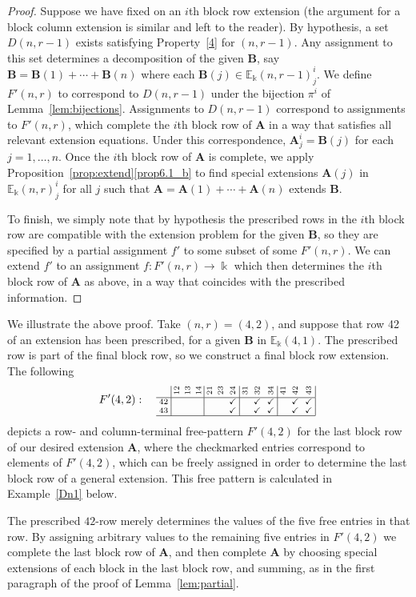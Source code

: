 \documentclass[ALCO,ThmDefs,Unicode,epreuves]{cedram}
\newcommand{\E}{\mathbb{E}}
\newcommand{\cm}{\checkmark}
\newcommand{\bA}{\mathbf{A}}
\newcommand{\bB}{\mathbf{B}}
\newcommand{\rt}[1]{\rotatebox{90}{#1}}
\begin{document}
\begin{proof}
Suppose we have fixed on an $i$th block row extension (the argument
for a block column extension is similar and left to the reader). By
hypothesis, a set $D(n,r-1)$ exists satisfying Property~\ref{4} for
$(n,r-1)$. Any assignment to this set determines a decomposition of
the given $\bB$, say $\bB = \bB(1)+ \cdots + \bB(n)$ where each
$\bB(j) \in \E_\Bbbk(n,r-1)^i_j$. We define $F'(n,r)$ to correspond
to $D(n,r-1)$ under the bijection $\pi^i$ of Lemma~\ref{lem:bijections}. Assignments to $D(n,r-1)$ correspond to
assignments to $F'(n,r)$, which complete the $i$th block row of $\bA$
in a way that satisfies all relevant extension equations. Under this
correspondence, $\bA^i_j = \bB(j)$ for each $j=1,\dots,n$. Once the
$i$th block row of $\bA$ is complete, we apply Proposition~\ref{prop:extend}\ref{prop6.1_b} to find special extensions $\bA(j)$ in $\E_\Bbbk(n,r)^i_j$ for all $j$ such that $\bA=\bA(1)+ \cdots +
\bA(n)$ extends $\bB$.

To finish, we simply note that by hypothesis the prescribed rows in
the $i$th block row are compatible with the extension problem for the
given $\bB$, so they are specified by a partial assignment $f'$ to
some subset of some $F'(n,r)$. We can extend $f'$ to an assignment
$f:F'(n,r)\to \Bbbk$ which then determines the $i$th block row of
$\bA$ as above, in a way that coincides with the prescribed
information.
\end{proof}



\goodbreak
\begin{exam}
We illustrate the above proof. Take $(n,r)=(4,2)$, and suppose that
row 42 of an extension has been prescribed, for a given $\bB$ in
$\E_\Bbbk(4,1)$. The prescribed row is part of the final block row, so
we construct a final block row extension. The following
\[
F'(4,2): \quad
\text{\setlength{\arraycolsep}{2.7pt}\scriptsize
$\displaystyle \begin{array}{c|ccc|ccc|ccc|ccc|}
 &\rt{12}&\rt{13}&\rt{14}&\rt{21} &\rt{23}&\rt{24}&\rt{31}&\rt{32}
 &\rt{34}&\rt{41}&\rt{42}&\rt{43} \\ \hline 
 42 &&&		&&&\cm		&&\cm&\cm	&&\cm&\cm\\ 
 43 &&&		&&&\cm		&&\cm&\cm	&&\cm&\cm\\ 
 \hline
\end{array}\; $}
\]
depicts a row- and column-terminal free-pattern $F'(4,2)$ for the last
block row of our desired extension $\bA$, where the checkmarked entries
correspond to elements of $F'(4,2)$, which can be freely assigned in
order to determine the last block row of a general extension. This
free pattern is calculated in Example~\ref{Dn1} below.

The prescribed $42$-row merely determines the values of the five free
entries in that row. By assigning arbitrary values to the remaining
five entries in $F'(4,2)$ we complete the last block row of $\bA$, and
then complete $\bA$ by choosing special extensions of each block in
the last block row, and summing, as in the first paragraph of the
proof of Lemma~\ref{lem:partial}.
\end{exam}
\end{document}
